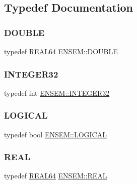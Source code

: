 \subsection{Typedef Documentation}
\mbox{\label{namespaceENSEM_adcbd0de4e9e0e7ef6aa9b681a554e2c5}} 
\subsubsection{\texorpdfstring{DOUBLE}{DOUBLE}}
{\footnotesize\ttfamily typedef \mbox{\hyperlink{namespaceENSEM_a85b215b9f1f43715aebee01718e25082}{R\+E\+A\+L64}} \mbox{\hyperlink{namespaceENSEM_adcbd0de4e9e0e7ef6aa9b681a554e2c5}{E\+N\+S\+E\+M\+::\+D\+O\+U\+B\+LE}}}

\mbox{\label{namespaceENSEM_a6a58e5c07422c48c5d547184b36719bf}} 
\subsubsection{\texorpdfstring{INTEGER32}{INTEGER32}}
{\footnotesize\ttfamily typedef int \mbox{\hyperlink{namespaceENSEM_a6a58e5c07422c48c5d547184b36719bf}{E\+N\+S\+E\+M\+::\+I\+N\+T\+E\+G\+E\+R32}}}

\mbox{\label{namespaceENSEM_ade7c8d5976e979516f8c2ecd223dd0b6}} 
\subsubsection{\texorpdfstring{LOGICAL}{LOGICAL}}
{\footnotesize\ttfamily typedef bool \mbox{\hyperlink{namespaceENSEM_ade7c8d5976e979516f8c2ecd223dd0b6}{E\+N\+S\+E\+M\+::\+L\+O\+G\+I\+C\+AL}}}

\mbox{\label{namespaceENSEM_a6dd9aa6508168f545c861787e63ddd1e}} 
\subsubsection{\texorpdfstring{REAL}{REAL}}
{\footnotesize\ttfamily typedef \mbox{\hyperlink{namespaceENSEM_a85b215b9f1f43715aebee01718e25082}{R\+E\+A\+L64}} \mbox{\hyperlink{namespaceENSEM_a6dd9aa6508168f545c861787e63ddd1e}{E\+N\+S\+E\+M\+::\+R\+E\+AL}}}

